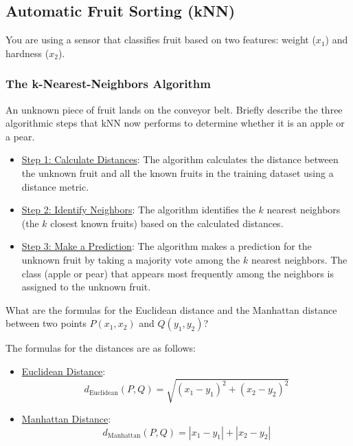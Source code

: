 \subsection*{Automatic Fruit Sorting (kNN)}

You are using a sensor that classifies fruit based on two features: weight ($x_1$) and hardness ($x_2$).

\subsubsection*{The k-Nearest-Neighbors Algorithm}
\begin{ejercicio}
    An unknown piece of fruit lands on the conveyor belt. Briefly describe the three algorithmic steps that kNN now performs to determine whether it is an apple or a pear.
    \begin{itemize}
        \item \ul{Step 1: Calculate Distances}: The algorithm calculates the distance between the unknown fruit and all the known fruits in the training dataset using a distance metric.
        \item \ul{Step 2: Identify Neighbors}: The algorithm identifies the $k$ nearest neighbors (the $k$ closest known fruits) based on the calculated distances.
        \item \ul{Step 3: Make a Prediction}: The algorithm makes a prediction for the unknown fruit by taking a majority vote among the $k$ nearest neighbors. The class (apple or pear) that appears most frequently among the neighbors is assigned to the unknown fruit.
    \end{itemize}
\end{ejercicio}
\begin{ejercicio}
    What are the formulas for the Euclidean distance and the Manhattan distance between two points $P(x_1, x_2)$ and $Q(y_1, y_2)$?

    The formulas for the distances are as follows:
    \begin{itemize}
        \item \ul{Euclidean Distance}:
        \begin{equation*}
            d_{\text{Euclidean}}(P, Q) = \sqrt{(x_1 - y_1)^2 + (x_2 - y_2)^2}
        \end{equation*}
        \item \ul{Manhattan Distance}:
        \begin{equation*}
            d_{\text{Manhattan}}(P, Q) = |x_1 - y_1| + |x_2 - y_2|
        \end{equation*}
    \end{itemize}
\end{ejercicio}
